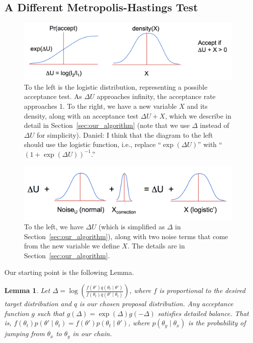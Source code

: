 \documentclass{article}
\newtheorem{lemma}{Lemma}
\begin{document}
\subsection{A Different Metropolis-Hastings Test}\label{sec:faster}

\begin{figure}[t]
  \centering
  \includegraphics[width=\textwidth]{john_bair_fig01}
  \caption{
  To the left is the logistic distribution, representing a possible acceptance test. As $\Delta U$
  approaches infinity, the acceptance rate approaches 1. To the right, we have a new variable $X$
  and its density, along with an acceptance test $\Delta U + X$, which we describe in detail in
  Section~\ref{sec:our_algorithm} (note that we use $\Delta$ instead of $\Delta U$ for simplicity).
  {\color{blue}
  Daniel: I think that the diagram to the left should use the logistic function, i.e., replace
  ``$\exp(\Delta U)$'' with ``$(1+\exp(\Delta U))^{-1}$.''
  }
  }
  \label{fig:part1}
\end{figure}

\begin{figure}[t]
  \centering
  \includegraphics[width=\textwidth]{john_bair_fig02}
  \caption{
  To the left, we have $\Delta U$ (which is simplified as $\Delta$ in
  Section~\ref{sec:our_algorithm}), along with two noise terms that come from the new variable we
  define $X$. The details are in Section~\ref{sec:our_algorithm}.
  }
  \label{fig:part2}
\end{figure}

Our starting point is the following Lemma.

\begin{lemma}\label{lem:detailed_balance}
Let $\Delta = \log \left(\frac{f(\theta') q(\theta_t \mid
\theta')}{f(\theta_t) q(\theta'\mid \theta_t)} \right)$, where $f$ is proportional to the desired target distribution and $q$ is our chosen
proposal distribution. Any acceptance function $g$ such that $g(\Delta) = \exp(\Delta) g(-\Delta )$
satisfies detailed balance. That is, $f(\theta_t)p(\theta' \mid \theta_t) = f(\theta')p(\theta_t
\mid \theta')$, where $p(\theta_y \mid \theta_x)$ is the probability of jumping from $\theta_x$ to $\theta_y$ in our chain.
\end{lemma}
\end{document}
